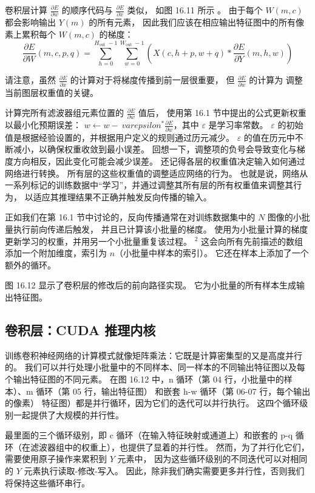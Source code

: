 卷积层计算 $\frac{\partial E}{\partial w}$ 的顺序代码与 $\frac{\partial E}{\partial x}$ 类似，
如图 16.11 所示 。 由于每个 $W(m, c)$ 都会影响输出 $Y(m)$ 的所有元素，
因此我们应该在相应输出特征图中的所有像素上累积每个 $W(m, c)$ 的梯度：
$$
\frac{\partial E}{\partial W}(m, c, p, q)=\sum_{h=0}^{H_{\text {out }}-1} \sum_{w=0}^ {W_{\text {out }}-1}\left(X(c, h+p, w+q) * \frac{\partial E}{\partial Y}(m, h, w)\right)
$$

请注意，虽然 $\frac{\partial E}{\partial x}$ 的计算对于将梯度传播到前一层很重要，
但 $\frac{\partial E}{\partial w}$ 的计算为 调整当前图层权重值的关键。

计算完所有滤波器组元素位置的 $\frac{\partial E}{\partial w}$ 值后，
使用第 16.1 节中提出的公式更新权重以最小化预期误差： $w \leftarrow w-\ varepsilon^{*} \frac{\partial E}{\partial w}$，其中 $\varepsilon$ 是学习率常数。 
$\varepsilon$ 的初始值是根据经验设置的，并根据用户定义的规则通过历元减少。 
$\varepsilon$ 的值在历元中不断减小，以确保权重收敛到最小误差。 
回想一下，调整项的负号会导致变化与梯度方向相反，因此变化可能会减少误差。 
还记得各层的权重值决定输入如何通过网络进行转换。 所有层的这些权重值的调整适应网络的行为。 
也就是说，网络从一系列标记的训练数据中“学习”，并通过调整其所有层的所有权重值来调整其行为，
以适应其推理结果不正确并触发反向传播的输入。

正如我们在第 16.1 节中讨论的，反向传播通常在对训练数据集中的 $N$ 图像的小批量执行前向传递后触发，
并且已计算该小批量的梯度。 使用为小批量计算的梯度更新学习的权重，并用另一个小批量重复该过程。 
${ }^{2}$ 这会向所有先前描述的数组添加一个附加维度，索引为 $n$（小批量中样本的索引）。 
它还在样本上添加了一个额外的循环。

图 16.12 显示了卷积层的修改后的前向路径实现。 它为小批量的所有样本生成输出特征图。

\subsection{卷积层：CUDA 推理内核}
训练卷积神经网络的计算模式就像矩阵乘法：它既是计算密集型的又是高度并行的。 
我们可以并行处理小批量中的不同样本、同一样本的不同输出特征图以及每个输出特征图的不同元素。 
在图 16.12 中，n 循环（第 04 行，小批量中的样本）、m 循环（第 05 行，输出特征图）
和嵌套 h-w 循环（第 06-07 行，每个输出的像素） 特征图）都是并行循环，因为它们的迭代可以并行执行。 
这四个循环级别一起提供了大规模的并行性。

最里面的三个循环级别，即 c 循环（在输入特征映射或通道上）和嵌套的 p-q 循环（在滤波器组中的权重上），也提供了显着的并行性。 
然而，为了并行化它们，需要使用原子操作来累积到 $Y$ 元素中，
因为这些循环级别的不同迭代可以对相同的 $Y$ 元素执行读取-修改-写入。 
因此，除非我们确实需要更多并行性，否则我们将保持这些循环串行。

